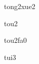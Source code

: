 \begin{multicols}{2}
\begin{hanzi}[同学]{tong2xue2}
\end{hanzi}

\begin{hanzi}[头]{tou2}
\end{hanzi}

\begin{hanzi}[头发]{tou2fa0}
\end{hanzi}

\begin{hanzi}[腿]{tui3}
\end{hanzi}

\end{multicols}
